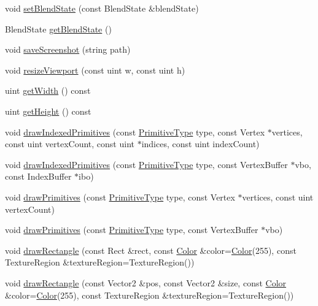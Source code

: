 \begin{DoxyCompactItemize}
void \hyperlink{class_graphics_context_aead84482bf5fbdc1f59fe748178aa6a8}{set\+Blend\+State} (const Blend\+State \&blend\+State)
\item 
Blend\+State \hyperlink{class_graphics_context_a7713be59d4d62a129c22789468439666}{get\+Blend\+State} ()
\item 
void \hyperlink{class_graphics_context_a0d4cbf012e3148ff546f3fc207196430}{save\+Screenshot} (string path)
\item 
void \hyperlink{class_graphics_context_a8d30cb975ff071bfd3e4e120141b10f8}{resize\+Viewport} (const uint w, const uint h)
\item 
uint \hyperlink{class_graphics_context_a290563bfc82e1ad627ac10bda066729e}{get\+Width} () const 
\item 
uint \hyperlink{class_graphics_context_ae84b5088898ed1f2a0ca2da13d7ebfe8}{get\+Height} () const 
\item 
void \hyperlink{class_graphics_context_aa3bbdf13b414214281ead0b3dc39f67a}{draw\+Indexed\+Primitives} (const \hyperlink{class_graphics_context_a240c1924416689e5700ff0d9f30539d9}{Primitive\+Type} type, const Vertex $\ast$vertices, const uint vertex\+Count, const uint $\ast$indices, const uint index\+Count)
\item 
void \hyperlink{class_graphics_context_ad62786dc06841b67d1a9fb95ea504081}{draw\+Indexed\+Primitives} (const \hyperlink{class_graphics_context_a240c1924416689e5700ff0d9f30539d9}{Primitive\+Type} type, const Vertex\+Buffer $\ast$vbo, const Index\+Buffer $\ast$ibo)
\item 
void \hyperlink{class_graphics_context_af00663a712ef5080cf9d732156328c03}{draw\+Primitives} (const \hyperlink{class_graphics_context_a240c1924416689e5700ff0d9f30539d9}{Primitive\+Type} type, const Vertex $\ast$vertices, const uint vertex\+Count)
\item 
void \hyperlink{class_graphics_context_ab5edd0597d4846689365f2807bbf67a6}{draw\+Primitives} (const \hyperlink{class_graphics_context_a240c1924416689e5700ff0d9f30539d9}{Primitive\+Type} type, const Vertex\+Buffer $\ast$vbo)
\item 
void \hyperlink{class_graphics_context_ace30d4bb10727b827910e159f6a34345}{draw\+Rectangle} (const Rect \&rect, const \hyperlink{struct_color}{Color} \&color=\hyperlink{struct_color}{Color}(255), const Texture\+Region \&texture\+Region=Texture\+Region())
\item 
void \hyperlink{class_graphics_context_a4d40c89661fd2488e6cf151f4bae3aef}{draw\+Rectangle} (const Vector2 \&pos, const Vector2 \&size, const \hyperlink{struct_color}{Color} \&color=\hyperlink{struct_color}{Color}(255), const Texture\+Region \&texture\+Region=Texture\+Region())

\end{DoxyCompactItemize}
